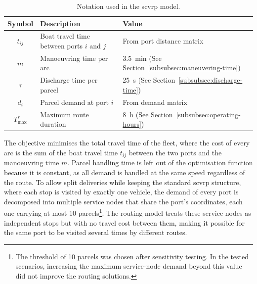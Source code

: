\documentclass[12pt]{article}
\begin{document}
\begin{table}[htbp]
  \centering
  \caption{Notation used in the \ac{scvrp} model.}
  \label{tab:scvrp_notation}

  \begin{tabularx}{\textwidth}{c X l}
    \toprule
    \textbf{Symbol}  & \textbf{Description}                           & \textbf{Value}                                                    \\
    \midrule
    \(t_{ij}\)       & Boat travel time between ports \(i\) and \(j\) & From port distance matrix                                         \\
    \(m\)            & Manoeuvring time per arc                       & \qty{3.5}{\minute} (See Section~\ref{subsubsec:maneuvering-time}) \\
    \(\tau\)         & Discharge time per parcel                      & \qty{25}{\second}  (See Section~\ref{subsubsec:discharge-time})   \\
    \(d_i\)          & Parcel demand at port \(i\)                    & From demand matrix                                                \\
    \(T^{r}_{\max}\) & Maximum route duration                         & \qty{8}{\hour}  (See Section~\ref{subsubsec:operating-hours})     \\
    \bottomrule
  \end{tabularx}
\end{table}

The objective minimises the total travel time of the fleet, where the cost of every arc is the sum of the boat travel time \(t_{ij}\) between the two ports and the manoeuvring time \(m\). Parcel handling time is left out of the optimisation function because it is constant, as all demand is handled at the same speed regardless of the route. To allow split deliveries while keeping the standard \ac{scvrp} structure, where each stop is visited by exactly one vehicle, the demand of every port is decomposed into multiple service nodes that share the port's coordinates, each one carrying at most \num{10} parcels\footnote{The threshold of \num{10} parcels was chosen after sensitivity testing. In the tested scenarios, increasing the maximum service-node demand beyond this value did not improve the routing solutions.}. The routing model treats these service nodes as independent stops but with no travel cost between them, making it possible for the same port to be visited several times by different routes.
\end{document}
